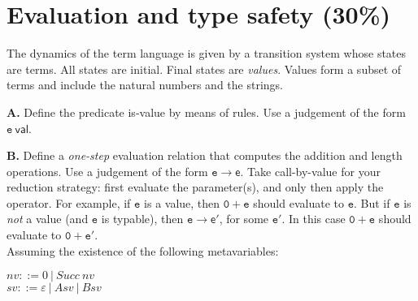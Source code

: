 \documentclass[a4paper]{article}
\begin{document}
\section{Evaluation and type safety (30\%) }

The dynamics of the term language is given by a transition system whose states
are terms. All states are initial. Final states are \emph{values}. Values form a
subset of terms and include the natural numbers and the strings.

\textbf{A.} Define the predicate is-value by means of rules. Use a judgement of
the form $\mathtt e~\mathsf{val}$.

\textbf{B.} Define a \emph{one-step} evaluation relation that computes the
addition and length operations. Use a judgement of the form
$\mathtt e\rightarrow\mathsf e$. Take call-by-value for your reduction strategy:
first evaluate the parameter(s), and only then apply the operator. For example,
if $\mathtt e$ is a value, then $\mathtt{0+e}$ should evaluate to $\mathtt e$.
But if $\mathtt e$ is \emph{not} a value (and $\mathtt e$ is typable), then
$\mathtt e\rightarrow\mathsf{e'}$, for some $\mathtt{e'}$. In this case
$\mathtt{0+e}$ should evaluate to $\mathtt{0+e'}$.\\

Assuming the existence of the following metavariables:
\begin{center}
$nv ::= 0 \ | \ Succ \ nv$\\
$sv ::= \varepsilon \ | \ Asv \ | \ Bsv$
\end{center}

\end{document}
